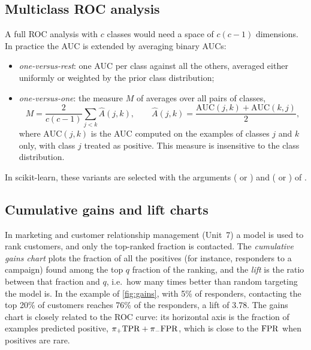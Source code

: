 \subsection{Multiclass ROC analysis}

A full ROC analysis with $c$ classes would need a space of $c(c-1)$ dimensions. In practice
the AUC is extended by averaging binary AUCs:
\begin{itemize}
  \item \emph{one-versus-rest}: one AUC per class against all the others, averaged either
        uniformly or weighted by the prior class distribution;
  \item \emph{one-versus-one}: the measure $M$ of \citet{hand2001simple} averages over all
        pairs of classes,
        \begin{equation*}
          M=\frac{2}{c(c-1)}\sum_{j<k}\hat A(j,k),\qquad
          \hat A(j,k)=\frac{\mathrm{AUC}(j,k)+\mathrm{AUC}(k,j)}{2},
        \end{equation*}
        where $\mathrm{AUC}(j,k)$ is the AUC computed on the examples of classes $j$ and $k$ only, with class $j$ treated as positive. This measure is insensitive to the class distribution.
\end{itemize}
In scikit-learn, these variants are selected with the arguments 
( or ) and  ( or ) of
.

\subsection{Cumulative gains and lift charts}

In marketing and customer relationship management (Unit~7) a model is used to rank customers,
and only the top-ranked fraction is contacted. The \emph{cumulative gains chart} plots the
fraction of all the positives (for instance, responders to a campaign) found among the top
$q$ fraction of the ranking, and the \emph{lift} is the ratio between that fraction and $q$,
i.e.\ how many times better than random targeting the model is. In the example of
\cref{fig:gains}, with 5\% of responders, contacting the top 20\% of customers reaches 76\% of
the responders, a lift of 3.78. The gains chart is closely related to the ROC curve: its
horizontal axis is the fraction of examples predicted positive,
$\pi_+\mathrm{TPR}+\pi_-\mathrm{FPR}$, which is close to the $\mathrm{FPR}$ when positives are rare.

